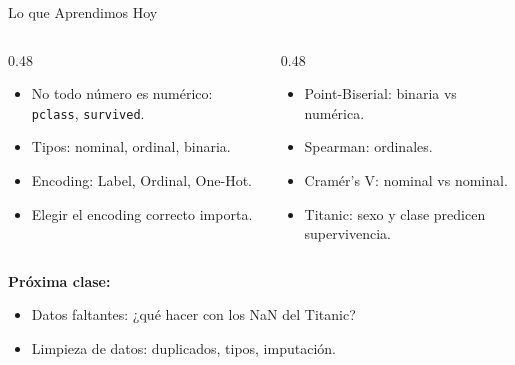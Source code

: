 \documentclass[aspectratio=169, 11pt]{beamer}
\begin{document}
\begin{frame}{Lo que Aprendimos Hoy}
  \vspace{-4pt}
  \begin{columns}[T]
    \begin{column}{0.48\textwidth}
      {\footnotesize
      \begin{itemize}\setlength{\itemsep}{4pt}
        \item[{\color{codeGreen}\faCheckCircle}]
          No todo número es numérico: \texttt{pclass}, \texttt{survived}.
        \item[{\color{codeGreen}\faCheckCircle}]
          Tipos: nominal, ordinal, binaria.
        \item[{\color{codeGreen}\faCheckCircle}]
          Encoding: Label, Ordinal, One-Hot.
        \item[{\color{codeGreen}\faCheckCircle}]
          Elegir el encoding correcto importa.
      \end{itemize}
      }
    \end{column}

    \begin{column}{0.48\textwidth}
      {\footnotesize
      \begin{itemize}\setlength{\itemsep}{4pt}
        \item[{\color{codeGreen}\faCheckCircle}]
          Point-Biserial: binaria vs numérica.
        \item[{\color{codeGreen}\faCheckCircle}]
          Spearman: ordinales.
        \item[{\color{codeGreen}\faCheckCircle}]
          Cramér's V: nominal vs nominal.
        \item[{\color{codeGreen}\faCheckCircle}]
          Titanic: sexo y clase predicen supervivencia.
      \end{itemize}
      }
    \end{column}
  \end{columns}

  \vspace{6pt}
  {\small\color{arcaDark}\bfseries Próxima clase:}
  \vspace{2pt}
  {\footnotesize
  \begin{itemize}\setlength{\itemsep}{2pt}
    \item[{\color{arcaRed}\faArrowRight}]
      Datos faltantes: ¿qué hacer con los NaN del Titanic?
    \item[{\color{arcaRed}\faArrowRight}]
      Limpieza de datos: duplicados, tipos, imputación.
  \end{itemize}
  }
\end{frame}
\end{document}
